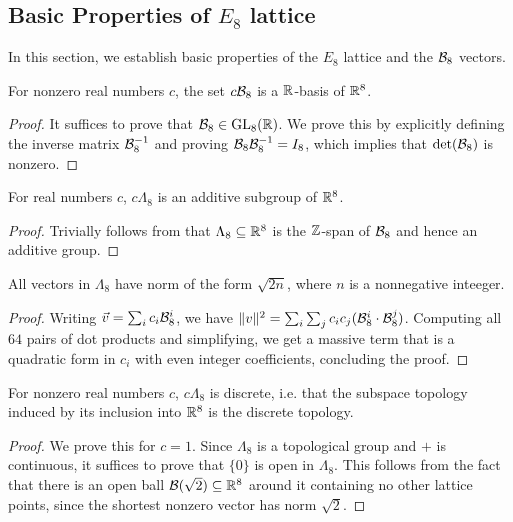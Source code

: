 \subsection{Basic Properties of $E_8$ lattice}

In this section, we establish basic properties of the $E_8$ lattice and the $\mathcal{B}_8$ vectors.

\begin{lemma}\label{E8-Scaled-is-basis}\leanok
  For nonzero real numbers $c$, the set $c\mathcal{B}_8$ is a $\mathbb{R}$-basis of $\mathbb{R}^8$.
\end{lemma}
\begin{proof}
  It suffices to prove that $\mathcal{B}_8 \in \mathrm{GL}_8(\mathbb{R})$. We prove this by explicitly defining the inverse matrix $\mathcal{B}_8^{-1}$ and proving $\mathcal{B}_8 \mathcal{B}_8^{-1} = I_8$, which implies that $\det(\mathcal{B}_8)$ is nonzero.
\end{proof}

\begin{lemma}\label{E8-Scaled-Lattice}\leanok
  For real numbers $c$, $c\Lambda_8$ is an additive subgroup of $\mathbb{R}^8$.
\end{lemma}
\begin{proof}\leanok
  Trivially follows from that $\Lambda_8 \subseteq \mathbb{R}^8$ is the $\mathbb{Z}$-span of $\mathcal{B}_8$ and hence an additive group.
\end{proof}

\begin{lemma}\label{E8-Shortest-Vector}\leanok
  All vectors in $\Lambda_8$ have norm of the form $\sqrt{2n}$, where $n$ is a nonnegative inteeger.
\end{lemma}
\begin{proof}
  Writing $\vec{v} = \sum_i c_i\mathcal{B}_8^i$, we have $\|v\|^2 = \sum_i \sum_j c_ic_j (\mathcal{B}_8^i \cdot \mathcal{B}_8^j)$. Computing all $64$ pairs of dot products and simplifying, we get a massive term that is a quadratic form in $c_i$ with even integer coefficients, concluding the proof.
\end{proof}

\begin{lemma}\label{instDiscreteE8ScaledLattice}\leanok
  For nonzero real numbers $c$, $c\Lambda_8$ is discrete, i.e. that the subspace topology induced by its inclusion into $\mathbb{R}^8$ is the discrete topology.
\end{lemma}
\begin{proof}
  We prove this for $c = 1$. Since $\Lambda_8$ is a topological group and $+$ is continuous, it suffices to prove that $\{0\}$ is open in $\Lambda_8$. This follows from the fact that there is an open ball $\mathcal{B}(\sqrt{2}) \subseteq \mathbb{R}^8$ around it containing no other lattice points, since the shortest nonzero vector has norm $\sqrt{2}$.
\end{proof}

